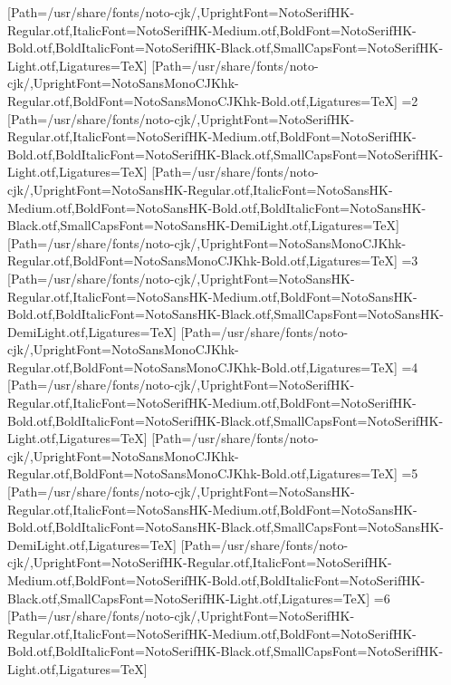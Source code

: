 [Path=/usr/share/fonts/noto-cjk/,UprightFont=NotoSerifHK-Regular.otf,ItalicFont=NotoSerifHK-Medium.otf,BoldFont=NotoSerifHK-Bold.otf,BoldItalicFont=NotoSerifHK-Black.otf,SmallCapsFont=NotoSerifHK-Light.otf,Ligatures=TeX]
[Path=/usr/share/fonts/noto-cjk/,UprightFont=NotoSansMonoCJKhk-Regular.otf,BoldFont=NotoSansMonoCJKhk-Bold.otf,Ligatures=TeX]
\else\ifnum\value{CJKFonts}=2
[Path=/usr/share/fonts/noto-cjk/,UprightFont=NotoSerifHK-Regular.otf,ItalicFont=NotoSerifHK-Medium.otf,BoldFont=NotoSerifHK-Bold.otf,BoldItalicFont=NotoSerifHK-Black.otf,SmallCapsFont=NotoSerifHK-Light.otf,Ligatures=TeX]
[Path=/usr/share/fonts/noto-cjk/,UprightFont=NotoSansHK-Regular.otf,ItalicFont=NotoSansHK-Medium.otf,BoldFont=NotoSansHK-Bold.otf,BoldItalicFont=NotoSansHK-Black.otf,SmallCapsFont=NotoSansHK-DemiLight.otf,Ligatures=TeX]
[Path=/usr/share/fonts/noto-cjk/,UprightFont=NotoSansMonoCJKhk-Regular.otf,BoldFont=NotoSansMonoCJKhk-Bold.otf,Ligatures=TeX]
\else\ifnum\value{CJKFonts}=3
[Path=/usr/share/fonts/noto-cjk/,UprightFont=NotoSansHK-Regular.otf,ItalicFont=NotoSansHK-Medium.otf,BoldFont=NotoSansHK-Bold.otf,BoldItalicFont=NotoSansHK-Black.otf,SmallCapsFont=NotoSansHK-DemiLight.otf,Ligatures=TeX]
[Path=/usr/share/fonts/noto-cjk/,UprightFont=NotoSansMonoCJKhk-Regular.otf,BoldFont=NotoSansMonoCJKhk-Bold.otf,Ligatures=TeX]
\else\ifnum\value{CJKFonts}=4
[Path=/usr/share/fonts/noto-cjk/,UprightFont=NotoSerifHK-Regular.otf,ItalicFont=NotoSerifHK-Medium.otf,BoldFont=NotoSerifHK-Bold.otf,BoldItalicFont=NotoSerifHK-Black.otf,SmallCapsFont=NotoSerifHK-Light.otf,Ligatures=TeX]
[Path=/usr/share/fonts/noto-cjk/,UprightFont=NotoSansMonoCJKhk-Regular.otf,BoldFont=NotoSansMonoCJKhk-Bold.otf,Ligatures=TeX]
\else\ifnum\value{CJKFonts}=5
[Path=/usr/share/fonts/noto-cjk/,UprightFont=NotoSansHK-Regular.otf,ItalicFont=NotoSansHK-Medium.otf,BoldFont=NotoSansHK-Bold.otf,BoldItalicFont=NotoSansHK-Black.otf,SmallCapsFont=NotoSansHK-DemiLight.otf,Ligatures=TeX]
[Path=/usr/share/fonts/noto-cjk/,UprightFont=NotoSerifHK-Regular.otf,ItalicFont=NotoSerifHK-Medium.otf,BoldFont=NotoSerifHK-Bold.otf,BoldItalicFont=NotoSerifHK-Black.otf,SmallCapsFont=NotoSerifHK-Light.otf,Ligatures=TeX]
\else\ifnum\value{CJKFonts}=6
[Path=/usr/share/fonts/noto-cjk/,UprightFont=NotoSerifHK-Regular.otf,ItalicFont=NotoSerifHK-Medium.otf,BoldFont=NotoSerifHK-Bold.otf,BoldItalicFont=NotoSerifHK-Black.otf,SmallCapsFont=NotoSerifHK-Light.otf,Ligatures=TeX]
